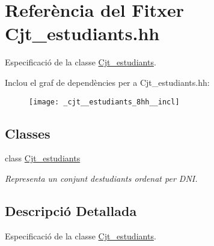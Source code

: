 \hypertarget{_cjt__estudiants_8hh}{}\section{Referència del Fitxer Cjt\+\_\+estudiants.\+hh}
\label{_cjt__estudiants_8hh}


Especificació de la classe \hyperlink{class_cjt__estudiants}{Cjt\+\_\+estudiants}.  


Inclou el graf de dependències per a Cjt\+\_\+estudiants.\+hh\+:
\nopagebreak
\begin{figure}[H]
\begin{center}
\leavevmode
\texttt{[image: \_cjt\_\_estudiants\_8hh\_\_incl]}
\end{center}
\end{figure}
\subsection*{Classes}
\begin{DoxyCompactItemize}
\item 
class \hyperlink{class_cjt__estudiants}{Cjt\+\_\+estudiants}
\begin{DoxyCompactList}\small\item\em Representa un conjunt d\textquotesingle{}estudiants ordenat per D\+NI. \end{DoxyCompactList}\end{DoxyCompactItemize}


\subsection{Descripció Detallada}
Especificació de la classe \hyperlink{class_cjt__estudiants}{Cjt\+\_\+estudiants}. 

